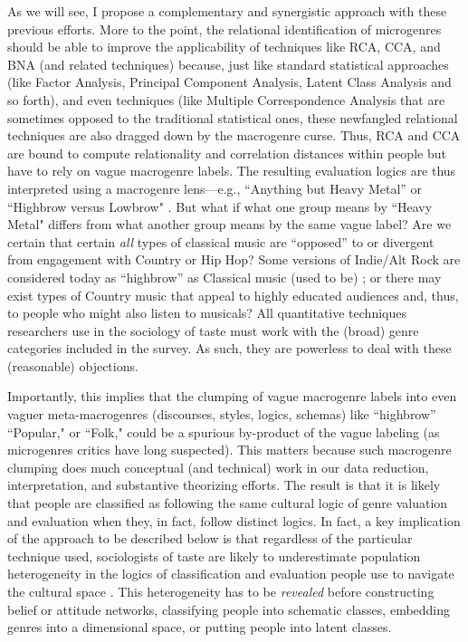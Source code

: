 \documentclass[a4paper,12pt]{extarticle}
\begin{document}
As we will see, I propose a complementary and synergistic approach with these previous efforts. More to the point, the relational identification of microgenres should be able to improve the applicability of techniques like RCA, CCA, and BNA (and related techniques) because, just like standard statistical approaches (like Factor Analysis, Principal Component Analysis, Latent Class Analysis and so forth), and even techniques (like Multiple Correspondence Analysis that are sometimes opposed to the traditional statistical ones, these newfangled relational techniques are also dragged down by the macrogenre curse. Thus, RCA and CCA are bound to compute relationality and correlation distances within people but have to rely on vague macrogenre labels. The resulting evaluation logics are thus interpreted using a macrogenre lens---e.g., ``Anything but Heavy Metal'' or ``Highbrow versus Lowbrow" \citep[e.g.,][]{goldberg2011mapping, willekens2022cultural}. But what if what one group means by ``Heavy Metal" differs from what another group means by the same vague label? Are we certain that certain {\em all} types of classical music are ``opposed'' to or divergent from engagement with Country or Hip Hop? Some versions of Indie/Alt Rock are considered today as ``highbrow'' as Classical music (used to be) \citep{Van_Poecke2018}; or there may exist types of Country music that appeal to highly educated audiences and, thus, to people who might also listen to musicals? All quantitative techniques researchers use in the sociology of taste must work with the (broad) genre categories included in the survey. As such, they are powerless to deal with these (reasonable) objections. 

Importantly, this implies that the clumping of vague macrogenre labels into even vaguer meta-macrogenres (discourses, styles, logics, schemas) like ``highbrow'' ``Popular," or ``Folk," could be a spurious by-product of the vague labeling (as microgenres critics have long suspected). This matters because such macrogenre clumping does much conceptual (and technical) work in our data reduction, interpretation, and substantive theorizing efforts. The result is that it is likely that people are classified as following the same cultural logic of genre valuation and evaluation when they, in fact, follow distinct logics. In fact, a key implication of the approach to be described below is that regardless of the particular technique used, sociologists of taste are likely to underestimate population heterogeneity in the logics of classification and evaluation people use to navigate the cultural space \citep{lahire2008individual}. This heterogeneity has to be {\em revealed} before constructing belief or attitude networks, classifying people into schematic classes, embedding genres into a dimensional space, or putting people into latent classes.
\end{document}
